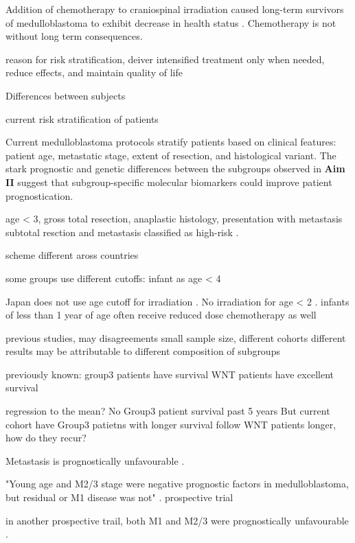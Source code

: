 Addition of chemotherapy to craniospinal irradiation caused long-term survivors of medulloblastoma to exhibit decrease in health status . Chemotherapy is not without long term consequences.

reason for risk stratification, deiver intensified treatment only when needed, reduce effects, and maintain quality of life

Differences between subjects

current risk stratification of patients

Current medulloblastoma protocols stratify patients based on clinical features: patient age, metastatic stage, extent of resection, and histological variant. The stark prognostic and genetic differences between the subgroups observed in \textbf{Aim II} suggest that subgroup-specific molecular biomarkers could improve patient prognostication.

age < 3, gross total resection, anaplastic histology, presentation with metastasis 
subtotal resction and metastasis classified as high-risk .

scheme different aross countries

some groups use different cutoffs: infant as age < 4 

Japan does not use age cutoff for irradiation .
No irradiation for age < 2 .
infants of less than 1 year of age often receive reduced dose chemotherapy as well

previous studies, may disagreements
small sample size, different cohorts
different results may be attributable to different composition of subgroups

previously known: group3 patients have survival
WNT patients have excellent survival

regression to the mean?
No Group3 patient survival past 5 years
But current cohort have Group3 patietns with longer survival
follow WNT patients longer, how do they recur?

Metastasis is prognostically unfavourable .

"Young age and M2/3 stage were negative prognostic factors in medulloblastoma, but residual or M1 disease was not" . prospective trial

in another prospective trail, both M1 and M2/3 were prognostically unfavourable .

